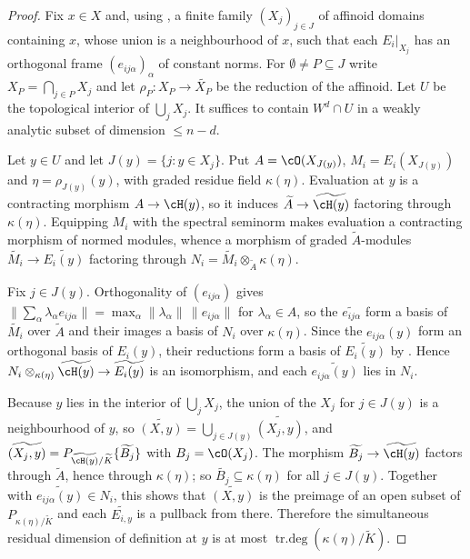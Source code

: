 \begin{proof}
Fix $x\in X$ and, using
, a finite family $(X_j)_{j\in J}$ of
affinoid domains containing $x$, whose union is a neighbourhood of $x$,
such that each $E_i|_{X_j}$ has an orthogonal frame
$(e_{ij\alpha})_\alpha$ of constant norms.  For $\emptyset\ne P\subseteq
J$ write $X_P=\bigcap_{j\in P}X_j$ and let
$\rho_P:X_P\to\widetilde{X_P}$ be the reduction of the affinoid.  Let
$U$ be the topological interior of $\bigcup_jX_j$.  It suffices to
contain $W^d\cap U$ in a weakly analytic subset of dimension $\le n-d$.

Let $y\in U$ and let $J(y)=\{j:y\in X_j\}$.  Put
$A=\cO(X_{J(y)})$, $M_i=E_i(X_{J(y)})$ and $\eta=\rho_{J(y)}(y)$, with
graded residue field $\kappa(\eta)$.  Evaluation at $y$ is a contracting
morphism $A\to\cH(y)$, so it induces
$\widetilde A\to\widetilde{\cH(y)}$ factoring through $\kappa(\eta)$.
Equipping $M_i$ with the spectral seminorm makes evaluation a contracting
morphism of normed modules, whence a morphism of graded
$\widetilde A$-modules $\widetilde{M_i}\to\widetilde{E_i(y)}$ factoring
through $N_i=\widetilde{M_i}\otimes_{\widetilde A}\kappa(\eta)$.

Fix $j\in J(y)$.  Orthogonality of $(e_{ij\alpha})$ gives
$\|\sum_\alpha\lambda_\alpha e_{ij\alpha}\|
 =\max_\alpha\|\lambda_\alpha\|\,\|e_{ij\alpha}\|$
for $\lambda_\alpha\in A$, so the $\widetilde{e_{ij\alpha}}$ form a
basis of $\widetilde{M_i}$ over $\widetilde A$ and their images
a basis of $N_i$ over $\kappa(\eta)$.  Since the $e_{ij\alpha}(y)$
form an orthogonal basis of $E_i(y)$, their reductions form a basis of
$\widetilde{E_i(y)}$ by .  Hence
$N_i\otimes_{\kappa(\eta)}\widetilde{\cH(y)}\to\widetilde{E_i(y)}$ is an
isomorphism, and each $\widetilde{e_{ij\alpha}(y)}$ lies in $N_i$.

Because $y$ lies in the interior of $\bigcup_jX_j$, the union of the
$X_j$ for $j\in J(y)$ is a neighbourhood of $y$, so
$\widetilde{(X,y)}=\bigcup_{j\in J(y)}\widetilde{(X_j,y)}$, and
$\widetilde{(X_j,y)}=P_{\widetilde{\cH(y)}/\widetilde K}\{\widetilde{B_j}\}$
with $B_j=\cO(X_j)$.  The morphism $\widetilde{B_j}\to\widetilde{\cH(y)}$
factors through $\widetilde A$, hence through $\kappa(\eta)$; so
$\widetilde{B_j}\subseteq\kappa(\eta)$ for all $j\in J(y)$.  Together
with $\widetilde{e_{ij\alpha}(y)}\in N_i$, this shows that
$\widetilde{(X,y)}$ is the preimage of an open subset of
$P_{\kappa(\eta)/\widetilde K}$ and each $\widetilde{E_{i,y}}$ is a
pullback from there.  Therefore the simultaneous residual dimension of
definition at $y$ is at most
$\operatorname{tr.deg}(\kappa(\eta)/\widetilde K)$.


\end{proof}
